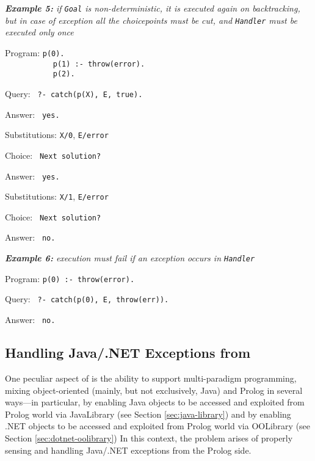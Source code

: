 \medskip\noindent
\textit{\textbf{Example 5:} if \texttt{Goal} is non-deterministic, it is executed again on backtracking, but in case of exception all the choicepoints must be cut, and \texttt{Handler} must be executed only once}

Program: \texttt{p(0).}\\
\mbox{\texttt{~~~~~~~~~~~}}\texttt{p(1) :- throw(error).}\\
\mbox{\texttt{~~~~~~~~~~~}}\texttt{p(2).}

Query: \texttt{ ?- catch(p(X), E, true).}

Answer: \texttt{ yes.}

Substitutions: \texttt{X/0}, \texttt{E/error}

Choice: \texttt{ Next solution?}

Answer: \texttt{ yes.}

Substitutions: \texttt{X/1}, \texttt{E/error}

Choice: \texttt{ Next solution?}

Answer: \texttt{ no.}


\medskip\noindent
\textit{\textbf{Example 6:} execution must fail if an exception occurs in \texttt{Handler}}

Program: \texttt{p(0) :- throw(error).}

Query: \texttt{ ?- catch(p(0), E, throw(err)).}

Answer: \texttt{ no.}

\subsection{Handling Java/.NET Exceptions from \tuprolog}
\label{ssec:java-exceptions-in-tuprolog}

One peculiar aspect of \tuprolog{} is the ability to support multi-paradigm programming, mixing object-oriented (mainly, but not exclusively, Java) and Prolog in several ways---in particular, by enabling Java objects to be accessed and exploited from Prolog world via JavaLibrary (see Section \ref{sec:java-library}) and by enabling .NET objects to be accessed and exploited from Prolog world via OOLibrary (see Section \ref{sec:dotnet-oolibrary})
%
In this context, the problem arises of properly sensing and handling Java/.NET exceptions from the Prolog side.

